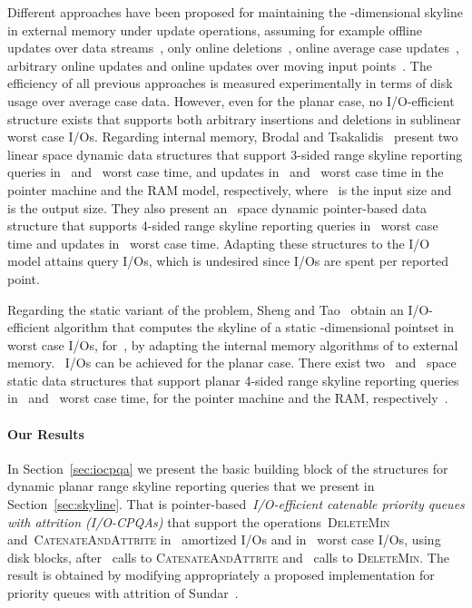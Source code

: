 \documentclass[]{article}
\begin{document}
Different approaches have been proposed for maintaining the -dimensional
skyline in external memory under update operations, assuming for example offline
updates over data streams~\cite{TP06,MPG07}, only online
deletions~\cite{WAEA07}, online average case updates~\cite{PTFS05}, arbitrary
online updates \cite{HZK08} and online updates over moving input
points~\cite{HLOT06}. The efficiency of all previous approaches is measured
experimentally in terms of disk usage over average case data. However, even for
the planar case, no I/O-efficient structure exists that supports both arbitrary
insertions and deletions in sublinear worst case I/Os. Regarding internal
memory, Brodal and Tsakalidis~\cite{BT11} present two linear space dynamic data
structures that support 3-sided range skyline reporting queries in~ and~ worst case time, and updates
in~ and~ worst case time in
the pointer machine and the RAM model, respectively, where~ is the input size
and~ is the output size. They also present an~ space dynamic
pointer-based data structure that supports 4-sided range skyline reporting
queries in~ worst case time and updates in~ worst case time. Adapting these structures to the I/O model attains
 query I/Os, which is undesired since 
I/Os are spent per reported point.

Regarding the static variant of the problem, Sheng and Tao~\cite{ST11} obtain an
I/O-efficient algorithm that computes the skyline of a static -dimensional
pointset in~ worst case
I/Os, for~, by adapting the internal memory algorithms of
\cite{KLP75,B80} to external memory. ~I/Os can be achieved for the planar
case. There exist two~ and~ space static data structures that support planar 4-sided range skyline
reporting queries in~ and~ worst case time, for the pointer machine and the RAM,
respectively~\cite{KDKS11,DGKASK12}.

\paragraph{Our Results}

In Section~\ref{sec:iocpqa} we present the basic building block of the
structures for dynamic planar range skyline reporting queries that we present in
Section~\ref{sec:skyline}. That is pointer-based~\textit{I/O-efficient catenable
priority queues with attrition (I/O-CPQAs)} that support the
operations~\textsc{DeleteMin} and~\textsc{CatenateAndAttrite} in~
amortized I/Os and in~ worst case I/Os, using 
disk blocks, after~ calls to \textsc{CatenateAndAttrite} and~ calls to
\textsc{DeleteMin}. The result is obtained by modifying appropriately a proposed
implementation for priority queues with attrition of Sundar~\cite{S89}.
 
\end{document}
